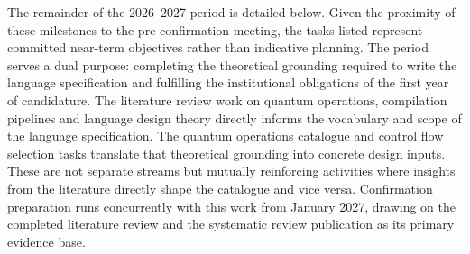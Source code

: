 The remainder of the 2026--2027 period is detailed below.
Given the proximity of these milestones to the pre-confirmation meeting, the tasks listed represent committed near-term objectives rather than indicative planning.
The period serves a dual purpose: completing the theoretical grounding required to write the language specification and fulfilling the institutional obligations of the first year of candidature.
The literature review work on quantum operations, compilation pipelines and language design theory directly informs the vocabulary and scope of the language specification.
The quantum operations catalogue and control flow selection tasks translate that theoretical grounding into concrete design inputs.
These are not separate streams but mutually reinforcing activities where insights from the literature directly shape the catalogue and vice versa.
Confirmation preparation runs concurrently with this work from January 2027, drawing on the completed literature review and the systematic review publication as its primary evidence base.

